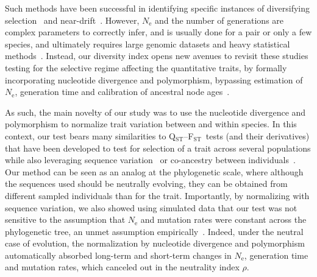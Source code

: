 \documentclass{article}
\newcommand{\Qst}{Q$_\text{ST}$}
\newcommand{\Fst}{F$_\text{ST}$}
\newcommand{\QstFst}{\Qst--\Fst}
\newcommand{\Ne}{N_{\text{e}}}
\newcommand{\NI}{\rho}
\begin{document}
Such methods have been successful in identifying specific instances of diversifying selection~\citep{schroeder_evolution_2017, machado_preeminent_2022} and near-drift~\citep{machado_using_2023}.
However, $\Ne$ and the number of generations are complex parameters to correctly infer, and is usually done for a pair or only a few species, and ultimately requires large genomic datasets and heavy statistical methods~\citep{wilder_contribution_2023}.
Instead, our diversity index opens new avenues to revisit these studies testing for the selective regime affecting the quantitative traits, by formally incorporating nucleotide divergence and polymorphism, bypassing estimation of $\Ne$, generation time and calibration of ancestral node ages~\citep{machado_using_2023}.

As such, the main novelty of our study was to use the nucleotide divergence and polymorphism to normalize trait variation between and within species.
In this context, our test bears many similarities to \QstFst\ tests (and their derivatives) that have been developed to test for selection of a trait across several populations while also leveraging sequence variation~\citep{martin_multivariate_2008, leinonen_qst_2013} or co-ancestry between individuals~\citep{ovaskainen_new_2011}.
Our method can be seen as an analog at the phylogenetic scale, where although the sequences used should be neutrally evolving, they can be obtained from different sampled individuals than for the trait.
Importantly, by normalizing with sequence variation, we also showed using simulated data that our test was not sensitive to the assumption that $\Ne$ and mutation rates were constant across the phylogenetic tree, an unmet assumption empirically~\citep{bergeron_evolution_2023, wilder_contribution_2023}.
Indeed, under the neutral case of evolution, the normalization by nucleotide divergence and polymorphism automatically absorbed long-term and short-term changes in $\Ne$, generation time and mutation rates, which canceled out in the neutrality index $\NI$.
\end{document}

